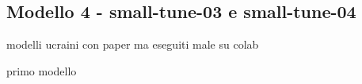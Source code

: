 \subsection*{Modello 4 - small-tune-03 e small-tune-04}


modelli ucraini con paper ma eseguiti male su colab




primo modello